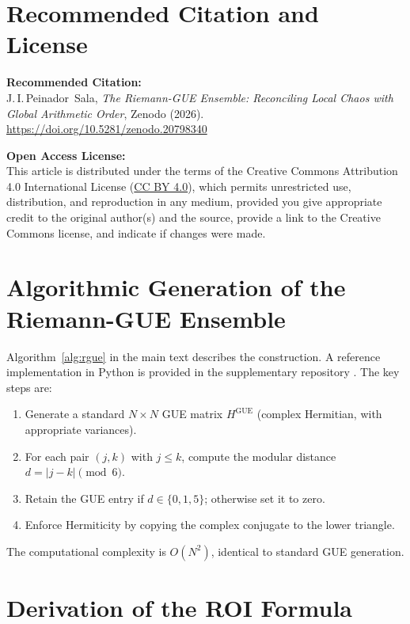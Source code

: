 \documentclass[12pt,a4paper]{article}
\theoremstyle{plain}
\theoremstyle{definition}
\theoremstyle{remark}
\begin{document}
\section*{Recommended Citation and License}

\noindent\textbf{Recommended Citation:} \\
J.\,I.\,Peinador~Sala, \emph{The Riemann-GUE Ensemble: Reconciling Local Chaos with Global Arithmetic Order}, Zenodo (2026). \url{https://doi.org/10.5281/zenodo.20798340}

\vspace{1em}
\noindent\textbf{Open Access License:} \\
This article is distributed under the terms of the Creative Commons Attribution 4.0 International License (\href{https://creativecommons.org/licenses/by/4.0/}{CC BY 4.0}), which permits unrestricted use, distribution, and reproduction in any medium, provided you give appropriate credit to the original author(s) and the source, provide a link to the Creative Commons license, and indicate if changes were made.

\appendix
\section{Algorithmic Generation of the Riemann-GUE Ensemble}
\label{app:algorithm}

Algorithm~\ref{alg:rgue} in the main text describes the construction. A reference implementation in Python is provided in the supplementary repository \cite{repo}. The key steps are:

\begin{enumerate}
    \item Generate a standard $N \times N$ GUE matrix $H^{\text{GUE}}$ (complex Hermitian, with appropriate variances).
    \item For each pair $(j,k)$ with $j \leq k$, compute the modular distance $d = |j-k| \pmod 6$.
    \item Retain the GUE entry if $d \in \{0,1,5\}$; otherwise set it to zero.
    \item Enforce Hermiticity by copying the complex conjugate to the lower triangle.
\end{enumerate}

The computational complexity is $O(N^2)$, identical to standard GUE generation.

\section{Derivation of the ROI Formula}
\label{app:roi_derivation}
\end{document}
